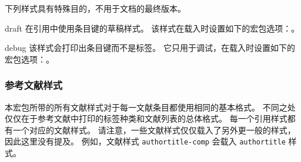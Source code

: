 下列样式具有特殊目的，不用于文档的最终版本。

\begin{marglist}

\item[draft]
在引用中使用条目键的草稿样式。
该样式在载入时设置如下的宏包选项：。

\item[debug]
该样式会打印出条目键而不是标签。
它只用于调试，在载入时设置如下的宏包选项：。

\end{marglist}

\subsubsection{参考文献样式}%
\label{use:xbx:bbx}


本宏包所带的所有文献样式对于每一文献条目都使用相同的基本格式。
不同之处仅仅在于参考文献中打印的标签种类和文献列表的总体格式。
每一个引用样式都有一个对应的文献样式。
请注意，一些文献样式仅仅载入了另外更一般的样式，因此这里没有提及。
例如，文献样式 \texttt{authortitle-comp} 会载入 \texttt{authortitle} 样式。

